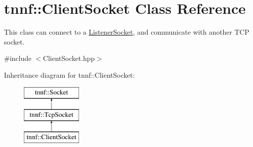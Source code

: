 \hypertarget{classtnnf_1_1_client_socket}{}\section{tnnf\+:\+:Client\+Socket Class Reference}
\label{classtnnf_1_1_client_socket}


This class can connect to a \hyperlink{classtnnf_1_1_listener_socket}{Listener\+Socket}, and communicate with another T\+C\+P socket.  




{\ttfamily \#include $<$Client\+Socket.\+hpp$>$}

Inheritance diagram for tnnf\+:\+:Client\+Socket\+:\begin{figure}[H]
\begin{center}
\leavevmode
\includegraphics[height=3.000000cm]{classtnnf_1_1_client_socket}
\end{center}
\end{figure}
